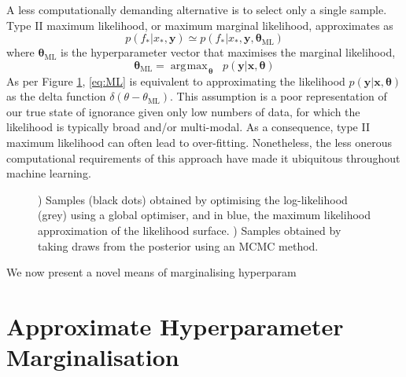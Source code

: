 \documentclass{article}
\newcommand{\vect}[1]{\mathbf{#1}}
\newcommand{\xd}{\vect{x}}
\newcommand{\yd}{\vect{y}}
\DeclareMathOperator*{\argmax}{\arg\!\max\!}
\begin{document}
A less computationally demanding alternative is to select only a single sample. Type II maximum likelihood, or maximum marginal likelihood, approximates as
\begin{equation} \label{eq:ML}
p(f_* |x_*, \yd) \simeq p(f_* | x_*, \yd,\bm{\theta}_{\mathrm{ML}})
\end{equation}
where $\bm{\theta}_{\mathrm{ML}}$ is the hyperparameter vector that maximises the marginal likelihood, 
\begin{equation}
\bm{\theta}_{\mathrm{ML}} = \argmax_{\bm{\theta}} \;\; p(\yd|\xd,\bm{\theta})
\end{equation}
As per Figure \ref{fig:ML}, \eqref{eq:ML} is equivalent to approximating the likelihood $p(\yd|\xd,\bm{\theta})$ as the delta function $\delta(\theta - \theta_{\mathrm{ML}})$. This assumption is a poor representation of our true state of ignorance given only low numbers of data, for which the likelihood is typically broad and/or multi-modal. As a consequence, type II maximum likelihood can often lead to over-fitting. Nonetheless, the less onerous computational requirements of this approach have made it ubiquitous throughout machine learning. 

\begin{figure}
	\begin{subfigure}[b]{7cm}
	  \caption{}
	  \label{fig:ML}
	\end{subfigure}
	\begin{subfigure}[b]{7cm}
	  \caption{}
	  \label{fig:MCMC}
	\end{subfigure}
\caption{) Samples (black dots) obtained by optimising the log-likelihood (grey) using a global optimiser, and in blue, the maximum likelihood approximation of the likelihood surface. ) Samples obtained by taking draws from the posterior using an MCMC method.}
\end{figure}

We now present a novel means of marginalising hyperparam

\section{Approximate Hyperparameter Marginalisation}
\end{document}
